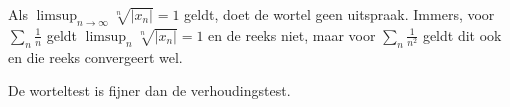\documentclass[main.tex]{subfiles}
\begin{document}
\begin{opm}
  Als $\limsup_{n\rightarrow \infty}\sqrt[n]{|x_{n}|}= 1$ geldt, doet de wortel geen uitspraak.
  Immers, voor $\sum_{n}\frac{1}{n}$ geldt $\limsup_{n}\sqrt[n]{|x_{n}|} = 1$ en de reeks niet, maar voor $\sum_{n}\frac{1}{n^{2}}$ geldt dit ook en die reeks convergeert wel.
\end{opm}


\begin{st}
  De worteltest is fijner dan de verhoudingstest.
\end{st}
\end{document}
